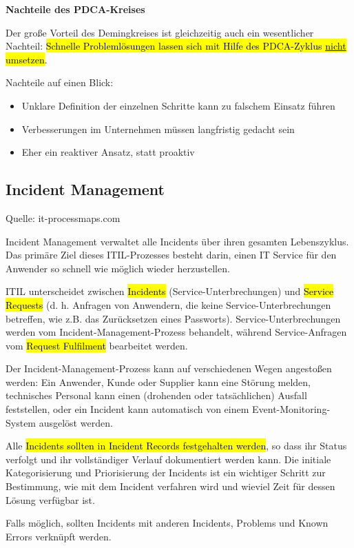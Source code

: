 \textbf{Nachteile des PDCA-Kreises}

Der große Vorteil des Demingkreises ist gleichzeitig auch ein wesentlicher Nachteil: \hl{Schnelle Problemlösungen lassen sich mit Hilfe des PDCA-Zyklus \mbox{\underline{nicht}} umsetzen}.

Nachteile auf einen Blick:

\begin{itemize}
	\item Unklare Definition der einzelnen Schritte kann zu falschem Einsatz führen
	\item Verbesserungen im Unternehmen müssen langfristig gedacht sein
	\item Eher ein reaktiver Ansatz, statt proaktiv
\end{itemize}

\subsection{Incident Management}
\label{sec:IncidentManagement}

Quelle: it-processmaps.com \cite{incidentManagement}

Incident Management verwaltet alle Incidents über ihren gesamten Lebenszyklus. Das primäre Ziel dieses ITIL-Prozesses besteht darin, einen IT Service für den Anwender so schnell wie möglich wieder herzustellen.

ITIL unterscheidet zwischen \hl{Incidents} (Service-Unterbrechungen) und \hl{Service Requests} (d. h. Anfragen von Anwendern, die keine Service-Unterbrechungen betreffen, wie z.B. das Zurücksetzen eines Passworts). Service-Unterbrechungen werden vom Incident-Management-Prozess behandelt, während Service-Anfragen vom \hl{Request Fulfilment} bearbeitet werden.

Der Incident-Management-Prozess kann auf verschiedenen Wegen angestoßen werden: Ein Anwender, Kunde oder Supplier kann eine Störung melden, technisches Personal kann einen (drohenden oder tatsächlichen) Ausfall feststellen, oder ein Incident kann automatisch von einem Event-Monitoring-System ausgelöst werden.

Alle \hl{Incidents sollten in Incident Records festgehalten werden}, so dass ihr Status verfolgt und ihr vollständiger Verlauf dokumentiert werden kann. Die initiale Kategorisierung und Priorisierung der Incidents ist ein wichtiger Schritt zur Bestimmung, wie mit dem Incident verfahren wird und wieviel Zeit für dessen Lösung verfügbar ist.

Falls möglich, sollten Incidents mit anderen Incidents, Problems und Known Errors verknüpft werden.

